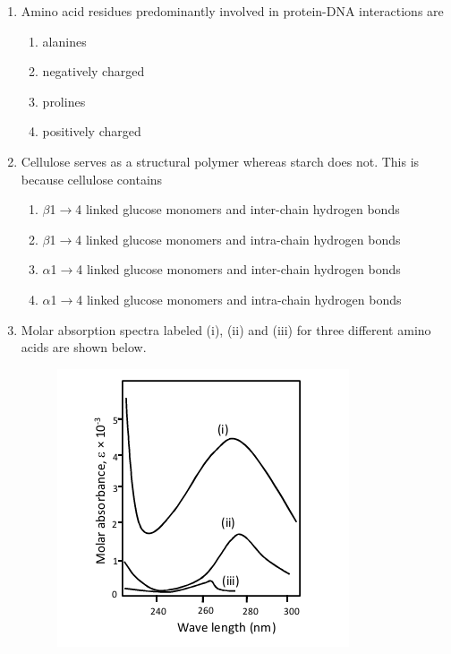 \documentclass[journal,12pt,onecolumn]{IEEEtran}
\begin{document}
\begin{enumerate}[label=\arabic*.]
\item Amino acid residues predominantly involved in protein-DNA interactions are

\begin{multicols}{4}
\begin{enumerate}[label=(\Alph*)]
\item alanines
\item negatively charged
\item prolines
\item positively charged
\end{enumerate}
\end{multicols}

\item Cellulose serves as a structural polymer whereas starch does not. This is because cellulose contains

\begin{enumerate}[label=(\Alph*)]
\item $\beta$1$\rightarrow$4 linked glucose monomers and inter-chain hydrogen bonds
\item $\beta$1$\rightarrow$4 linked glucose monomers and intra-chain hydrogen bonds
\item $\alpha$1$\rightarrow$4 linked glucose monomers and inter-chain hydrogen bonds
\item $\alpha$1$\rightarrow$4 linked glucose monomers and intra-chain hydrogen bonds
\end{enumerate}

\item Molar absorption spectra labeled (i), (ii) and (iii) for three different amino acids are shown below.

 \begin{figure}[H]
 \centering
 \includegraphics[width=0.7\columnwidth]{FIG/I-8.png}
 \caption*{}
 \label{fig:I-8}
 \end{figure}


\end{enumerate}
\end{document}
